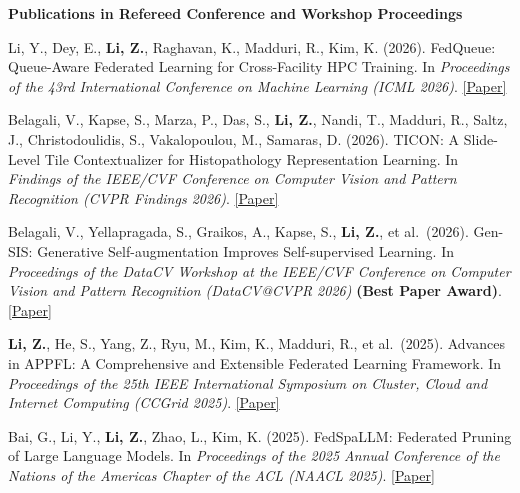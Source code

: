 \documentclass[letterpaper,11pt]{article}
\newcommand{\PubSection}[1]{%
  \vspace{6pt}\noindent\textbf{#1}\vspace{3pt}%
}
\begin{document}
\PubSection{Publications in Refereed Conference and Workshop Proceedings}
\begin{enumerate}[leftmargin=1cm, label={[\arabic*]}, itemsep=3pt]
  \small

  \item Li, Y., Dey, E., \textbf{Li, Z.}, Raghavan, K., Madduri, R., Kim, K. (2026). FedQueue: Queue-Aware Federated Learning for Cross-Facility HPC Training. In \textit{Proceedings of the 43rd International Conference on Machine Learning (ICML 2026)}. \href{https://openreview.net/pdf?id=ODWi7lbMGU}{[Paper]}

  \item Belagali, V., Kapse, S., Marza, P., Das, S., \textbf{Li, Z.}, Nandi, T., Madduri, R., Saltz, J., Christodoulidis, S., Vakalopoulou, M., Samaras, D. (2026). TICON: A Slide-Level Tile Contextualizer for Histopathology Representation Learning. In \textit{Findings of the IEEE/CVF Conference on Computer Vision and Pattern Recognition (CVPR Findings 2026)}. \href{https://openaccess.thecvf.com/content/CVPR2026F/papers/Belagali_TICON_A_Slide-Level_Tile_Contextualizer_for_Histopathology_Representation_Learning_CVPRF_2026_paper.pdf}{[Paper]}


  \item Belagali, V., Yellapragada, S., Graikos, A., Kapse, S., \textbf{Li, Z.}, et al.\ (2026). Gen-SIS: Generative Self-augmentation Improves Self-supervised Learning. In \textit{Proceedings of the DataCV Workshop at the IEEE/CVF Conference on Computer Vision and Pattern Recognition (DataCV@CVPR 2026)} \textbf{(Best Paper Award)}. \href{https://openaccess.thecvf.com/content/CVPR2026W/DataCV/papers/Belagali_Gen-SIS_Generative_Self-augmentation_Improves_Self-supervised_Learning_CVPRW_2026_paper.pdf}{[Paper]}

  \item \textbf{Li, Z.}, He, S., Yang, Z., Ryu, M., Kim, K., Madduri, R., et al.\ (2025). Advances in APPFL: A Comprehensive and Extensible Federated Learning Framework. In \textit{Proceedings of the 25th IEEE International Symposium on Cluster, Cloud and Internet Computing (CCGrid 2025)}. \href{https://arxiv.org/abs/2409.11585}{[Paper]}

  \item Bai, G., Li, Y., \textbf{Li, Z.}, Zhao, L., Kim, K. (2025). FedSpaLLM: Federated Pruning of Large Language Models. In \textit{Proceedings of the 2025 Annual Conference of the Nations of the Americas Chapter of the ACL (NAACL 2025)}. \href{https://arxiv.org/abs/2410.14852}{[Paper]}


\end{enumerate}
\end{document}
